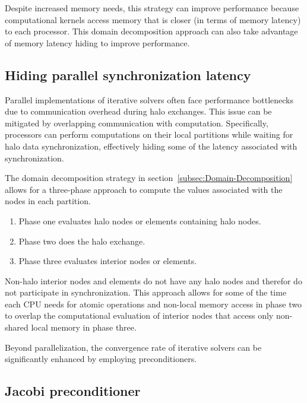 \documentclass[]             %
{NASA}                       %
\begin{document}
Despite increased memory needs, this strategy can improve performance because computational kernels access memory that is closer (in terms of memory latency) to each processor. This domain decomposition approach can also take advantage of memory latency hiding\cite{ref:latency-hiding} to improve performance.

\subsection{Hiding parallel synchronization latency}
\label{subsec:hide-parallel-sync-latency}

Parallel implementations of iterative solvers often face performance bottlenecks due to communication overhead during halo exchanges. This issue can be mitigated by overlapping communication with computation. Specifically, processors can perform computations on their local partitions while waiting for halo data synchronization, effectively hiding some of the latency associated with synchronization.

The domain decomposition strategy in section~\ref{subsec:Domain-Decomposition} allows for a three-phase approach to compute the values associated with the nodes in each partition.
\begin{enumerate}
\item{Phase one evaluates halo nodes or elements containing halo nodes.}
\item{Phase two does the halo exchange.}
\item{Phase three evaluates interior nodes or elements.}
\end{enumerate}
Non-halo interior nodes and elements do not have any halo nodes and therefor do not participate in synchronization. This approach allows for some of the time each CPU needs for atomic operations and non-local memory access in phase two to overlap the computational evaluation of interior nodes that access only non-shared local memory in phase three.

Beyond parallelization, the convergence rate of iterative solvers can be significantly enhanced by employing preconditioners.

\subsection{Jacobi preconditioner}
\label{subsec:jacobi-preconditioner}
\end{document}
